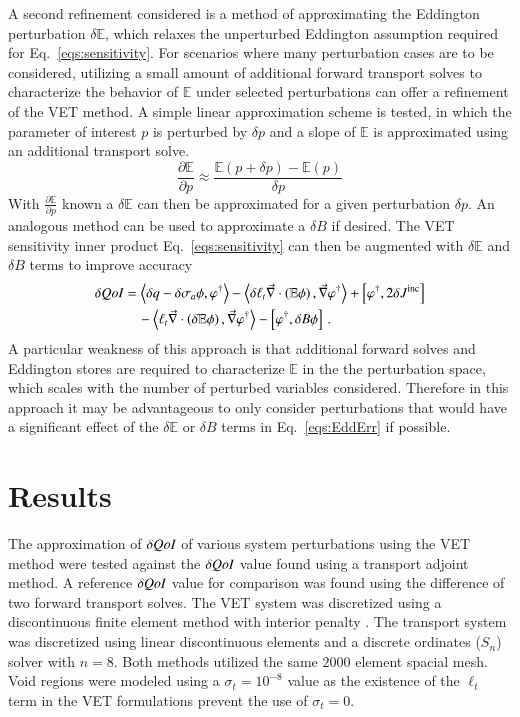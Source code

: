 \documentclass{anstrans}
\newcommand{\bra}{\left\langle}
\newcommand{\ket}{\right\rangle}
\newcommand{\sbra}{\left[}
\newcommand{\sket}{\right]}
\renewcommand{\div}{\vec{\nabla} \cdot}
\newcommand{\grad}{\vec{\nabla}}
\newcommand{\vefadj}{\varphi^\dag}
\newcommand{\Edd}{\mathbb{E}}
\newcommand{\BEdd}{B}
\newcommand{\sigt}{\sigma_t}
\newcommand{\siga}{\sigma_a}
\newcommand{\isigt}{\ell_t}
\newcommand{\scalSource}{q}
\newcommand{\qoi}{{\it QoI}\xspace}
\begin{document}
A second refinement considered is a method of approximating the Eddington perturbation $\delta \Edd$, which relaxes the unperturbed Eddington assumption required for Eq.~\eqref{eqs:sensitivity}. For scenarios where many perturbation cases are to be considered, utilizing a small amount of additional forward transport solves to characterize the behavior of $\Edd$ under selected perturbations can offer a refinement of the VET method. A simple linear approximation scheme is tested, in which the parameter of interest $p$ is perturbed by $\delta p$ and a slope of $\Edd$ is approximated using an additional transport solve. 
\begin{equation}
\label{Eddapprox}
\frac{\partial \Edd}{\partial p} \approx \frac{\Edd(p+\delta p) - \Edd(p)}{\delta p}
\end{equation}
With $\frac{\partial \Edd}{\partial p}$ known a $\delta \Edd$ can then be approximated for a given perturbation $\delta p$. An analogous method can be used to approximate a $\delta \BEdd$ if desired. The VET sensitivity inner product Eq.~\eqref{eqs:sensitivity} can then be augmented with $\delta \Edd$ and $\delta \BEdd$ terms to improve accuracy
\begin{equation}
\label{eqs:EddErr}
\begin{split}
\delta \qoi &=  \bra \delta \scalSource - \delta \siga \phi, \vefadj \ket  - \bra \delta \isigt \div \left( \Edd \phi \right) , \grad \vefadj \ket
 + \sbra \vefadj, 2 \delta J^{\text{inc}} \sket \\
 & \quad - \bra  \isigt \div \left( \delta \Edd \phi \right), \grad \vefadj \ket
- \sbra \vefadj, \delta \BEdd \phi \sket \,.
\end{split}
\end{equation} 
A particular weakness of this approach is that additional forward solves and Eddington stores are required to characterize $\Edd$ in the the perturbation space, which scales with the number of perturbed variables considered. Therefore in this approach it may be advantageous to only consider perturbations that would have a significant effect of the $\delta \Edd$ or $\delta \BEdd$ terms in Eq.~\eqref{eqs:EddErr} if possible. 


\section{Results}
The approximation of $\delta \qoi$ of various system perturbations using the VET method were tested against the $\delta \qoi$ value found using a transport adjoint method. A reference $\delta \qoi$ value for comparison was found using the difference of two forward transport solves. The VET system was discretized using a discontinuous finite element method with interior penalty \cite{Arnold}. The transport system was discretized using linear discontinuous elements and a discrete ordinates ($S_n$) solver with $n=8$. Both methods utilized the same $2000$ element spacial mesh. Void regions were modeled using a $\sigt=10^{-8}$ value as the existence of the $\isigt$ term in the VET formulations prevent the use of $\sigt=0$.
\end{document}
